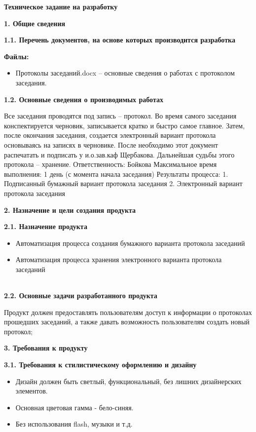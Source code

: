 \documentclass[12pt,a4paper]{article}
\begin{document}
	\begin{center}\textbf{Техническое задание на разработку}\end{center}
	
	\textbf{1. Общие сведения}
	
	\textbf{1.1. Перечень документов, на основе которых производится разработка}
	
	\textbf{Файлы:}
	
	\begin{itemize}
		\item Протоколы заседаний.docx – основные сведения о работах с протоколом заседания.
	\end{itemize}
	\textbf{1.2. Основные сведения о производимых работах}
	
	Все заседания проводятся под запись – протокол. Во время самого заседания конспектируется черновик, записывается кратко и быстро самое главное. Затем, после окончания заседания, создается электронный вариант протокола основываясь на записях в черновике. После необходимо этот документ распечатать и подписать у и.о.зав.каф Щербакова. Дальнейшая судьбы этого протокола – хранение.
	Ответственность: Бойкова
	Максимальное время выполнения: 1 день (с момента начала заседания)
	Результаты процесса:
		1. Подписанный бумажный вариант протокола заседания
		2. Электронный вариант протокола заседания
	
	\textbf{2. Назначение и цели создания продукта}
	
	\textbf{2.1. Назначение продукта}
	
	\begin{itemize}
		\item	Автоматизация процесса создания бумажного варианта протокола заседаний
		\item	Автоматизация процесса хранения электронного варианта протокола заседаний
	\end{itemize}
	\\
	\textbf{2.2. Основные задачи разработанного продукта}
	
	Продукт должен предоставлять пользователям доступ к информации о протоколах прошедших заседаний, а также давать возможность пользователям создать новый протокол;
	
	\textbf{3. Требования к продукту}
	
	\textbf{3.1. Требования к стилистическому оформлению и дизайну}
	
	\begin{itemize}
		\item	Дизайн должен быть светлый, функциональный, без лишних дизайнерских элементов.
		\item	Основная цветовая гамма - бело-синяя.
		\item	Без использования flash, музыки и т.д.
	\end{itemize}
	
\end{document}
